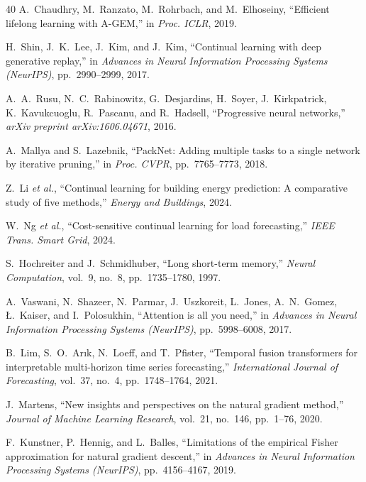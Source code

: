\documentclass[journal]{IEEEtran}
\begin{document}
\begin{thebibliography}{40}
A.~Chaudhry, M.~Ranzato, M.~Rohrbach, and M.~Elhoseiny, ``Efficient
lifelong learning with A-GEM,'' in \emph{Proc. ICLR}, 2019.

H.~Shin, J.~K.~Lee, J.~Kim, and J.~Kim, ``Continual learning with deep
generative replay,'' in \emph{Advances in Neural Information Processing
Systems (NeurIPS)}, pp.~2990--2999, 2017.

A.~A.~Rusu, N.~C.~Rabinowitz, G.~Desjardins, H.~Soyer, J.~Kirkpatrick,
K.~Kavukcuoglu, R.~Pascanu, and R.~Hadsell, ``Progressive neural
networks,'' \emph{arXiv preprint arXiv:1606.04671}, 2016.

A.~Mallya and S.~Lazebnik, ``PackNet: Adding multiple tasks to a
single network by iterative pruning,'' in \emph{Proc. CVPR},
pp.~7765--7773, 2018.

Z.~Li \emph{et al.}, ``Continual learning for building energy
prediction: A comparative study of five methods,'' \emph{Energy and
Buildings}, 2024.

W.~Ng \emph{et al.}, ``Cost-sensitive continual learning for load
forecasting,'' \emph{IEEE Trans. Smart Grid}, 2024.

S.~Hochreiter and J.~Schmidhuber, ``Long short-term memory,''
\emph{Neural Computation}, vol.~9, no.~8, pp.~1735--1780, 1997.

A.~Vaswani, N.~Shazeer, N.~Parmar, J.~Uszkoreit, L.~Jones, A.~N.~Gomez,
\L{}.~Kaiser, and I.~Polosukhin, ``Attention is all you need,'' in
\emph{Advances in Neural Information Processing Systems (NeurIPS)},
pp.~5998--6008, 2017.

B.~Lim, S.~O.~Ar{\i}k, N.~Loeff, and T.~Pfister, ``Temporal fusion
transformers for interpretable multi-horizon time series forecasting,''
\emph{International Journal of Forecasting}, vol.~37, no.~4,
pp.~1748--1764, 2021.

J.~Martens, ``New insights and perspectives on the natural gradient
method,'' \emph{Journal of Machine Learning Research}, vol.~21,
no.~146, pp.~1--76, 2020.

F.~Kunstner, P.~Hennig, and L.~Balles, ``Limitations of the empirical
Fisher approximation for natural gradient descent,'' in \emph{Advances
in Neural Information Processing Systems (NeurIPS)}, pp.~4156--4167,
2019.


\end{thebibliography}
\end{document}
